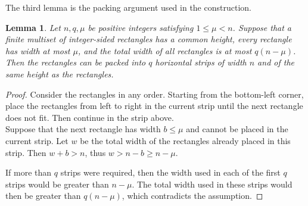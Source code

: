 \documentclass[12pt,a4paper]{amsart}
\numberwithin{equation}{section}
\theoremstyle{plain}
\newtheorem{lm}[thm]{Lemma}
\theoremstyle{definition}
\theoremstyle{remark}
\newtheorem{re}[thm]{Remark}
\begin{document}

The third lemma is the packing argument used in the construction.

\begin{lm}\label{lm: packing strips}
Let $n,q,\mu$ be positive integers satisfying $1\le  \mu<n$. Suppose that a finite multiset of integer-sided rectangles has a common height, every rectangle has width at most $\mu$, and the total width of all rectangles is at most $q(n-\mu)$. Then the rectangles can be packed into $q$ horizontal strips of width $n$ and of the same height as the rectangles.
\end{lm}
\begin{proof}
Consider the rectangles in any order. Starting from the bottom-left corner, place the rectangles from left to right in the current strip until the next rectangle does not fit. Then continue in the strip above.\\
Suppose that the next rectangle has width $b\le \mu$ and cannot be placed in the current strip. Let $w$ be the total width of the rectangles already placed in this strip. 
Then $w+b>n$, thus $w>n-b\geq n-\mu$. 

If more than $q$ strips were required, then the width used in each of the first $q$ strips would be greater than $n-\mu$. The total width used in these strips would then be greater than $q(n-\mu)$, which contradicts the assumption.
\end{proof}

\end{document}
